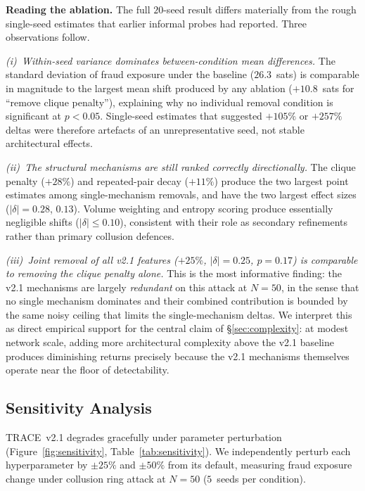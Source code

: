 \documentclass[sigconf,nonacm,10pt]{acmart}
\begin{document}
\noindent\textbf{Reading the ablation.}
The full $20$-seed result differs materially from the rough
single-seed estimates that earlier informal probes had reported.
Three observations follow.

\noindent\textit{(i)~Within-seed variance dominates between-condition
mean differences.} The standard deviation of fraud exposure under
the baseline ($26.3$~sats) is comparable in magnitude to the
largest mean shift produced by any ablation
($+10.8$~sats for ``remove clique penalty''), explaining why no
individual removal condition is significant at $p<0.05$.
Single-seed estimates that suggested $+105\%$ or $+257\%$
deltas were therefore artefacts of an unrepresentative seed,
not stable architectural effects.

\noindent\textit{(ii)~The structural mechanisms are still ranked
correctly directionally.} The clique penalty ($+28\%$) and
repeated-pair decay ($+11\%$) produce the two largest point
estimates among single-mechanism removals, and have the two
largest effect sizes ($|\delta| = 0.28$, $0.13$). Volume
weighting and entropy scoring produce essentially negligible
shifts ($|\delta| \le 0.10$), consistent with their role as
secondary refinements rather than primary collusion defences.

\noindent\textit{(iii)~Joint removal of all v2.1 features
($+25\%$, $|\delta| = 0.25$, $p = 0.17$) is comparable to
removing the clique penalty alone.} This is the most
informative finding: the v2.1 mechanisms are largely
\emph{redundant} on this attack at $N{=}50$, in the sense that
no single mechanism dominates and their combined contribution
is bounded by the same noisy ceiling that limits the
single-mechanism deltas. We interpret this as direct empirical
support for the central claim of \S\ref{sec:complexity}: at
modest network scale, adding more architectural complexity
above the v2.1 baseline produces diminishing returns precisely
because the v2.1 mechanisms themselves operate near the floor of
detectability.

\subsection{Sensitivity Analysis}
\label{sec:eval:sensitivity}

TRACE~v2.1 degrades gracefully under parameter perturbation
(Figure~\ref{fig:sensitivity},
Table~\ref{tab:sensitivity}). We independently perturb each
hyperparameter by $\pm 25\%$ and $\pm 50\%$ from its default,
measuring fraud exposure change under collusion ring attack at
$N{=}50$ ($5$~seeds per condition).
\end{document}
